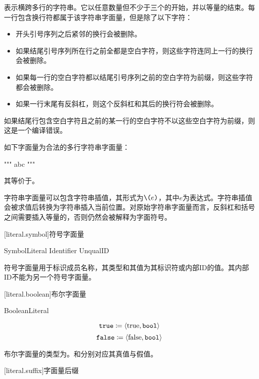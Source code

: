 \pnum
{}表示横跨多行的字符串。它以任意数量但不少于三个的开始，并以等量的结束。每一行包含换行符都属于该字符串字面量，但是除了以下字符：

\begin{itemize}
    \item 开头引号序列之后紧邻的换行会被删除。
    \item 如果结尾引号序列所在行之前全都是空白字符，则这些字符连同上一行的换行会被删除。
    \item 如果每一行的空白字符都以结尾引号序列之前的空白字符为前缀，则这些字符都会被删除。
    \item 如果一行末尾有反斜杠，则这个反斜杠和其后的换行符会被删除。
\end{itemize}

如果结尾行包含空白字符且之前的某一行的空白字符不以这些空白字符为前缀，则这是一个编译错误。

\enterexample
如下字面量为合法的多行字符串字面量：
\begin{codeblock}
"""
abc
"""
\end{codeblock}
其等价于。
\exitexample

\pnum
字符串字面量可以包含字符串插值，其形式为$\texttt{\textbackslash(}e\texttt{)}$，其中$e$为表达式。字符串插值会被求值后转换为字符串插入当前位置。对原始字符串字面量而言，反斜杠和括号之间需要插入等量的，否则仍然会被解释为字面符号。

[literal.symbol]{符号字面量}

\begin{bnf}{SymbolLiteral}
     Identifier \br
     UnqualID \terminal{)}
\end{bnf}

\pnum
符号字面量用于标识成员名称，其类型和其值为其标识符或内部ID的值。其内部ID不能为另一个符号字面量。

[literal.boolean]{布尔字面量}

\begin{bnf}{BooleanLiteral}
     \br
\end{bnf}

$$ \texttt{true} \coloneqq \langle \mathrm{true}, \texttt{bool} \rangle $$
$$ \texttt{false} \coloneqq \langle \mathrm{false}, \texttt{bool} \rangle $$

\pnum
布尔字面量的类型为。和分别对应其真值与假值。

[literal.suffix]{字面量后缀}

